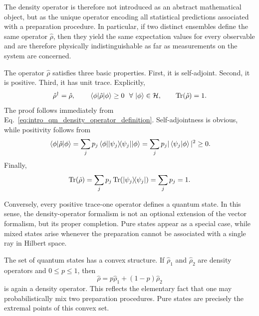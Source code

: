 The density operator is therefore not introduced as an abstract mathematical object, but as the unique operator encoding all statistical predictions associated with a preparation procedure. In particular, if two distinct ensembles define the same operator $\hat \rho$, then they yield the same expectation values for every observable and are therefore physically indistinguishable as far as measurements on the system are concerned.

The operator $\hat \rho$ satisfies three basic properties. First, it is self-adjoint. Second, it is positive. Third, it has unit trace. Explicitly,
\begin{equation}
	\hat \rho^\dagger=\hat \rho,
	\qquad
	\matrixel{\phi}{\hat \rho}{\phi}\geq 0 \ \ \forall\,\ket{\phi}\in\mathcal{H},
	\qquad
	\Tr(\hat \rho)=1.
	\label{eq:intro_qm_density_operator_properties}
\end{equation}
The proof follows immediately from Eq.~\eqref{eq:intro_qm_density_operator_definition}. Self-adjointness is obvious, while positivity follows from
\begin{equation}
	\matrixel{\phi}{\hat \rho}{\phi}
	=
	\sum_j p_j \matrixel{\phi}{\dyad{\psi_j}{\psi_j}}{\phi}
	=
	\sum_j p_j |\braket{\psi_j}{\phi}|^2
	\geq 0.
	\label{eq:intro_qm_density_operator_positivity_derivation}
\end{equation}
Finally,
\begin{equation}
	\Tr(\hat \rho)
	=
	\sum_j p_j \Tr\!\left(\dyad{\psi_j}{\psi_j}\right)
	=
	\sum_j p_j
	=
	1.
	\label{eq:intro_qm_density_operator_trace_derivation}
\end{equation}

Conversely, every positive trace-one operator defines a quantum state. In this sense, the density-operator formalism is not an optional extension of the vector formalism, but its proper completion. Pure states appear as a special case, while mixed states arise whenever the preparation cannot be associated with a single ray in Hilbert space.

The set of quantum states has a convex structure. If $\hat \rho_1$ and $\hat \rho_2$ are density operators and $0\leq p\leq 1$, then
\begin{equation}
	\hat \rho=p\hat \rho_1+(1-p)\hat \rho_2
	\label{eq:intro_qm_convex_structure_states}
\end{equation}
is again a density operator. This reflects the elementary fact that one may probabilistically mix two preparation procedures. Pure states are precisely the extremal points of this convex set.


